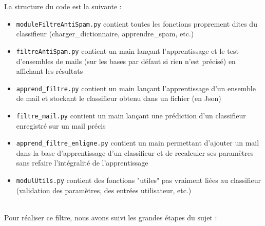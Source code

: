 \documentclass{report}
\begin{document}
\noindent La structure du code est la suivante : 
\begin{itemize}
\item \verb|moduleFiltreAntiSpam.py| contient toutes les fonctions proprement dites du classifieur (charger\_dictionnaire, apprendre\_spam, etc.)
\item \verb|filtreAntiSpam.py| contient un main lançant l'apprentissage et le test d'ensembles de mails (sur les bases par défaut si rien n'est précisé) en affichant les résultats
\item \verb|apprend_filtre.py| contient un main lançant l'apprentissage d'un ensemble de mail et stockant le classifieur obtenu dans un fichier (en Json)
\item \verb|filtre_mail.py| contient un main lançant une prédiction d'un classifieur enregistré sur un mail précis
\item \verb|apprend_filtre_enligne.py| contient un main permettant d'ajouter un mail dans la base d'apprentissage d'un classifieur et de recalculer ses paramètres sans refaire l'intégralité de l'apprentissage
\item \verb|modulUtils.py| contient des fonctions "utiles" pas vraiment liées au classifieur (validation des paramètres, des entrées utilisateur, etc.)
\end{itemize}
\ \\
\noindent Pour réaliser ce filtre, nous avons suivi les grandes étapes du sujet : 
\end{document}
